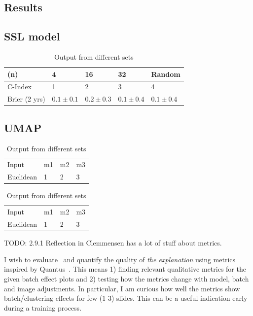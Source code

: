 \documentclass[10pt,twocolumn,letterpaper]{article}
\begin{document}
\subsection{Results}
\subsection{SSL model}
\begin{table}
\centering
  \begin{tabular}{l l l l l}
    (n) & 4 & 16 & 32 & Random \\
    \hline
    C-Index & 1 & 2 & 3 & 4 \\
    Brier (2 yrs) & $0.1 \pm 0.1$ & $0.2 \pm 0.3$ & $0.1 \pm 0.4$ & $0.1 \pm 0.4$  \\
    \hline
  \end{tabular}
  \caption{Output from different sets}
  \label{tab:combinedres}
\end{table}


\subsection{UMAP}
\begin{table}
\centering
  \begin{tabular}{l l l l}
    Input & m1 & m2 & m3 \\
    Euclidean & 1 & 2 & 3 \\
  \end{tabular}
  \caption{Output from different sets}
  \label{tab:singleres}
\end{table}

\begin{table}
\centering
  \begin{tabular}{l l l l}
    Input & m1 & m2 & m3 \\
    Euclidean & 1 & 2 & 3 \\
  \end{tabular}
  \caption{Output from different sets}
  \label{tab:combinedres}
\end{table}

TODO: 2.9.1 Reflection in Clemmensen has a lot of stuff about metrics.

I wish to evaluate~\cite{sslUMAP} and quantify the quality of \textit{the explanation} using metrics inspired by Quantus~\cite{hedstrom2023quantus}. This means 1) finding relevant qualitative metrics for the given batch effect plots and 2) testing how the metrics change with model, batch and image adjustments. In particular, I am curious how well the metrics show batch/clustering effects for few (1-3) slides. This can be a useful indication early during a training process.

{\small


}
\end{document}

